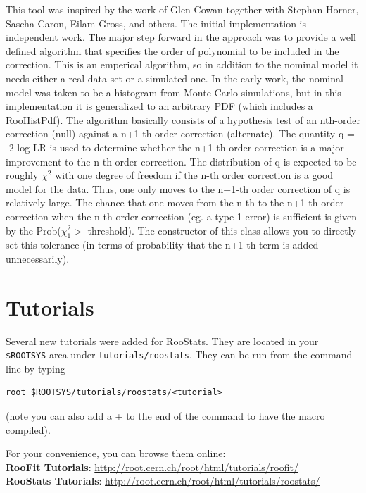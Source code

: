 \documentclass[11pt]{article}
\begin{document}
This tool was inspired by the work of Glen Cowan together with Stephan Horner, Sascha Caron,  Eilam Gross, and others.   The initial implementation is independent work.  The major step forward in the approach was  to provide a well defined algorithm that specifies the order of polynomial to be included  in the correction.  This is an emperical algorithm, so in addition to the nominal model it  needs either a real data set or a simulated one.  In the early work, the nominal model was taken to be a histogram from Monte Carlo simulations, but in this implementation it is generalized to an arbitrary PDF (which includes a RooHistPdf).  The algorithm basically consists of a  hypothesis test of an nth-order correction (null) against a n+1-th order correction (alternate).  The quantity q = -2 log LR is used to determine whether the n+1-th order correction is a major  improvement to the n-th order correction.  The distribution of q is expected to be roughly  $\chi^2$ with one degree of freedom if the n-th order correction is a good model for the data.   Thus, one only moves to the n+1-th order correction of q is relatively large.  The chance that  one moves from the n-th to the n+1-th order correction when the n-th order correction  (eg. a type 1 error) is sufficient is given by the Prob($\chi^2_1 >$ threshold).  The constructor  of this class allows you to directly set this tolerance (in terms of probability that the n+1-th  term is added unnecessarily).


\section{Tutorials}


Several new tutorials were added for RooStats.  They are located in your \texttt{\$ROOTSYS} area under \texttt{tutorials/roostats}.  They can be run from the command line by typing
\begin{lstlisting}[backgroundcolor=\color{shellcommand}]
root $ROOTSYS/tutorials/roostats/<tutorial>
\end{lstlisting}
%
(note you can also add a + to the end of the command to have the macro compiled).

For your convenience, you can browse them online:\\
{\bf RooFit Tutorials}: \url{http://root.cern.ch/root/html/tutorials/roofit/} \\
{\bf RooStats Tutorials}: \url{http://root.cern.ch/root/html/tutorials/roostats/} \\
\end{document}

